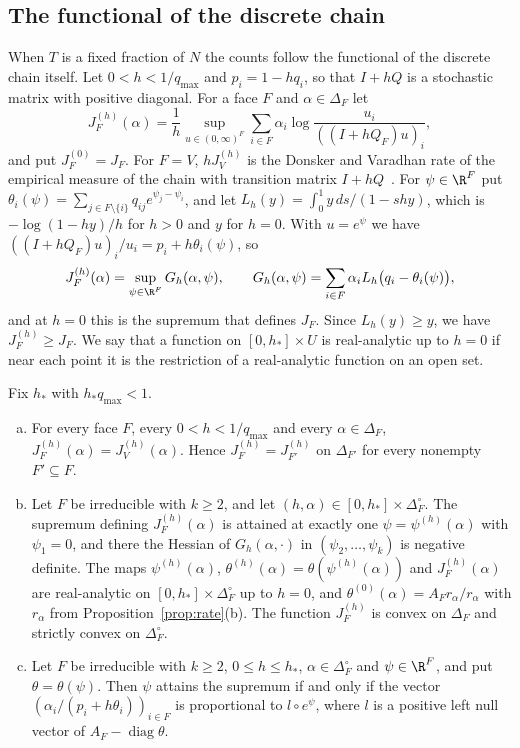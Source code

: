 \subsection{The functional of the discrete chain}\label{sec:discrete-rate}

When $T$ is a fixed fraction of $N$ the counts follow the functional of the
discrete chain itself. Let $0<h<1/q_{\max}$ and $p_i=1-hq_i$, so that $I+hQ$ is
a stochastic matrix with positive diagonal. For a face $F$ and
$\alpha\in\Delta_F$ let
\[
 J^{(h)}_F(\alpha)=\frac1h\sup_{u\in(0,\infty)^F}\sum_{i\in F}\alpha_i
 \log\frac{u_i}{((I+hQ_F)u)_i},
\]
and put $J^{(0)}_F=J_F$. For $F=V$, $hJ^{(h)}_V$ is the Donsker and Varadhan rate
of the empirical measure of the chain with transition matrix
$I+hQ$~\cite{dv1975}. For $\psi\in\R^F$ put
$\theta_i(\psi)=\sum_{j\in F\setminus\{i\}}q_{ij}e^{\psi_j-\psi_i}$, and let
$L_h(y)=\int_0^1y\,ds/(1-shy)$, which is $-\log(1-hy)/h$ for $h>0$ and $y$ for
$h=0$. With $u=e^\psi$ we have $((I+hQ_F)u)_i/u_i=p_i+h\theta_i(\psi)$, so
\[
 J^{(h)}_F(\alpha)=\sup_{\psi\in\R^F}G_h(\alpha,\psi),\qquad
 G_h(\alpha,\psi)=\sum_{i\in F}\alpha_iL_h\bigl(q_i-\theta_i(\psi)\bigr),
\]
and at $h=0$ this is the supremum that defines $J_F$. Since $L_h(y)\ge y$, we
have $J^{(h)}_F\ge J_F$. We say that a function on $[0,h_*]\times U$ is
real-analytic up to $h=0$ if near each point it is the restriction of a
real-analytic function on an open set.

\begin{proposition}\label{prop:discrete-rate}
Fix $h_*$ with $h_*q_{\max}<1$.
\begin{enumerate}[(a)]
\item For every face $F$, every $0<h<1/q_{\max}$ and every $\alpha\in\Delta_F$,
$J^{(h)}_F(\alpha)=J^{(h)}_V(\alpha)$. Hence $J^{(h)}_F=J^{(h)}_{F'}$ on
$\Delta_{F'}$ for every nonempty $F'\subseteq F$.
\item Let $F$ be irreducible with $k\ge2$, and let
$(h,\alpha)\in[0,h_*]\times\Delta_F^\circ$. The supremum defining
$J^{(h)}_F(\alpha)$ is attained at exactly one $\psi=\psi^{(h)}(\alpha)$ with
$\psi_1=0$, and there the Hessian of $G_h(\alpha,\cdot)$ in
$(\psi_2,\dots,\psi_k)$ is negative definite. The maps $\psi^{(h)}(\alpha)$,
$\theta^{(h)}(\alpha)=\theta(\psi^{(h)}(\alpha))$ and $J^{(h)}_F(\alpha)$ are
real-analytic on $[0,h_*]\times\Delta_F^\circ$ up to $h=0$, and
$\theta^{(0)}(\alpha)=A_Fr_\alpha/r_\alpha$ with $r_\alpha$ from
Proposition~\ref{prop:rate}(b). The function $J^{(h)}_F$ is convex on $\Delta_F$
and strictly convex on $\Delta_F^\circ$.
\item Let $F$ be irreducible with $k\ge2$, $0\le h\le h_*$,
$\alpha\in\Delta_F^\circ$ and $\psi\in\R^F$, and put $\theta=\theta(\psi)$. Then
$\psi$ attains the supremum if and only if the vector
$(\alpha_i/(p_i+h\theta_i))_{i\in F}$ is proportional to $l\circ e^\psi$, where
$l$ is a positive left null vector of $A_F-\operatorname{diag}\theta$.
\end{enumerate}
\end{proposition}

